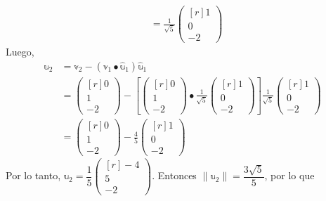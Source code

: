 \begin{example}
\begin{align*}
        & = \frac{1}{\sqrt{5}} \begin{pmatrix*}[r]
            1 \\
            0 \\
            -2
        \end{pmatrix*}
    \end{align*}\newpage\noindent
    Luego,
    \begin{align*}
        \mathbb{u}_2 & = \mathbb{v}_2 - (\mathbb{v}_1 \bullet \hat{\mathbb{u}}_1) \hat{\mathbb{u}}_1 \\
        & = \begin{pmatrix*}[r]
            0 \\
            1 \\
            -2
        \end{pmatrix*} - \left[ \begin{pmatrix*}[r]
            0 \\
            1 \\
            -2
        \end{pmatrix*} \bullet \frac{1}{\sqrt{5}} \begin{pmatrix*}[r]
            1 \\
            0 \\
            -2
        \end{pmatrix*} \right] \frac{1}{\sqrt{5}} \begin{pmatrix*}[r]
            1 \\
            0 \\
            -2
        \end{pmatrix*} \\
        & = \begin{pmatrix*}[r]
            0 \\
            1 \\
            -2
        \end{pmatrix*} - \frac{4}{5} \begin{pmatrix*}[r]
            1 \\
            0 \\
            -2
        \end{pmatrix*}
    \end{align*}
    Por lo tanto, $\mathbb{u}_2 = \dfrac{1}{5} \begin{pmatrix*}[r]
        -4 \\
        5 \\
        -2
    \end{pmatrix*}$. Entonces $\| \mathbb{u}_2 \| = \dfrac{3\sqrt{5}}{5}$, por lo que

\end{example}
